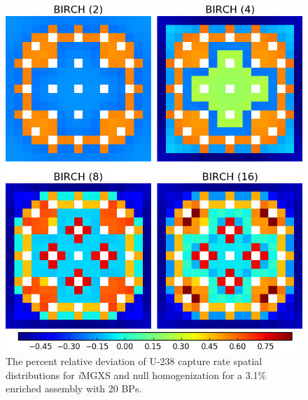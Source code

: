 \begin{figure}[h!]
\centering
\includegraphics[width=0.9\linewidth]{figures/results/compare/assm-31-20BPs/compare-capt}
\vspace{2mm}
\caption[U-238 capture rate comparison for a 3.1\% enriched assembly with 20 BPs]{The percent relative deviation of U-238 capture rate spatial distributions for \textit{i}\ac{MGXS} and null homogenization for a 3.1\% enriched assembly with 20 \acp{BP}.}
\label{fig:chap11-assm-31-20BPs-capt-rates-comp}
\end{figure}
	
\clearpage


